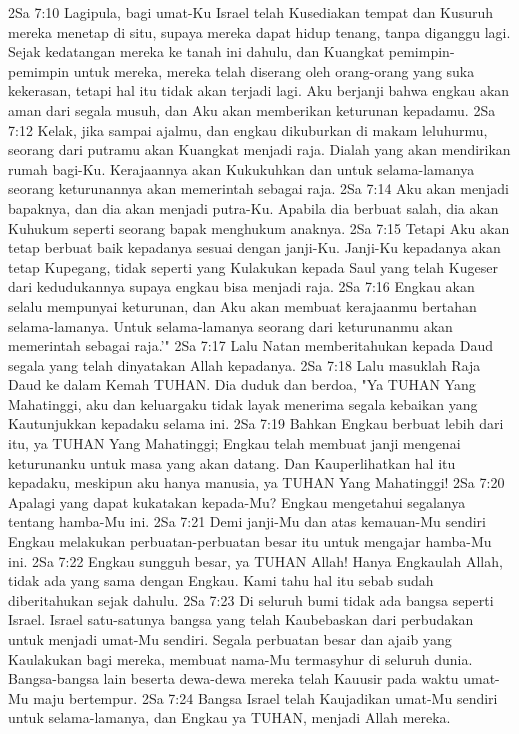 2Sa 7:10  Lagipula, bagi umat-Ku Israel telah Kusediakan tempat dan Kusuruh mereka menetap di situ, supaya mereka dapat hidup tenang, tanpa diganggu lagi. Sejak kedatangan mereka ke tanah ini dahulu, dan Kuangkat pemimpin-pemimpin untuk mereka, mereka telah diserang oleh orang-orang yang suka kekerasan, tetapi hal itu tidak akan terjadi lagi. Aku berjanji bahwa engkau akan aman dari segala musuh, dan Aku akan memberikan keturunan kepadamu.
2Sa 7:12  Kelak, jika sampai ajalmu, dan engkau dikuburkan di makam leluhurmu, seorang dari putramu akan Kuangkat menjadi raja. Dialah yang akan mendirikan rumah bagi-Ku. Kerajaannya akan Kukukuhkan dan untuk selama-lamanya seorang keturunannya akan memerintah sebagai raja.
2Sa 7:14  Aku akan menjadi bapaknya, dan dia akan menjadi putra-Ku. Apabila dia berbuat salah, dia akan Kuhukum seperti seorang bapak menghukum anaknya.
2Sa 7:15  Tetapi Aku akan tetap berbuat baik kepadanya sesuai dengan janji-Ku. Janji-Ku kepadanya akan tetap Kupegang, tidak seperti yang Kulakukan kepada Saul yang telah Kugeser dari kedudukannya supaya engkau bisa menjadi raja.
2Sa 7:16  Engkau akan selalu mempunyai keturunan, dan Aku akan membuat kerajaanmu bertahan selama-lamanya. Untuk selama-lamanya seorang dari keturunanmu akan memerintah sebagai raja.'"
2Sa 7:17  Lalu Natan memberitahukan kepada Daud segala yang telah dinyatakan Allah kepadanya.
2Sa 7:18  Lalu masuklah Raja Daud ke dalam Kemah TUHAN. Dia duduk dan berdoa, "Ya TUHAN Yang Mahatinggi, aku dan keluargaku tidak layak menerima segala kebaikan yang Kautunjukkan kepadaku selama ini.
2Sa 7:19  Bahkan Engkau berbuat lebih dari itu, ya TUHAN Yang Mahatinggi; Engkau telah membuat janji mengenai keturunanku untuk masa yang akan datang. Dan Kauperlihatkan hal itu kepadaku, meskipun aku hanya manusia, ya TUHAN Yang Mahatinggi!
2Sa 7:20  Apalagi yang dapat kukatakan kepada-Mu? Engkau mengetahui segalanya tentang hamba-Mu ini.
2Sa 7:21  Demi janji-Mu dan atas kemauan-Mu sendiri Engkau melakukan perbuatan-perbuatan besar itu untuk mengajar hamba-Mu ini.
2Sa 7:22  Engkau sungguh besar, ya TUHAN Allah! Hanya Engkaulah Allah, tidak ada yang sama dengan Engkau. Kami tahu hal itu sebab sudah diberitahukan sejak dahulu.
2Sa 7:23  Di seluruh bumi tidak ada bangsa seperti Israel. Israel satu-satunya bangsa yang telah Kaubebaskan dari perbudakan untuk menjadi umat-Mu sendiri. Segala perbuatan besar dan ajaib yang Kaulakukan bagi mereka, membuat nama-Mu termasyhur di seluruh dunia. Bangsa-bangsa lain beserta dewa-dewa mereka telah Kauusir pada waktu umat-Mu maju bertempur.
2Sa 7:24  Bangsa Israel telah Kaujadikan umat-Mu sendiri untuk selama-lamanya, dan Engkau ya TUHAN, menjadi Allah mereka.
